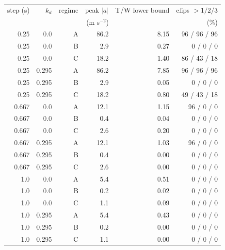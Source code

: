 \footnotesize
\begin{tabular}{rrrrrr}
\toprule
step (s) & $k_d$ & regime & peak $|a|$ & T/W lower bound & clips $>1/2/3$ \\
 & & & (m s$^{-2}$) & & (\%) \\
\midrule
0.25 & 0.0 & A & 86.2 & 8.15 & 96 / 96 / 96 \\
0.25 & 0.0 & B & 2.9 & 0.27 & 0 / 0 / 0 \\
0.25 & 0.0 & C & 18.2 & 1.40 & 86 / 43 / 18 \\
0.25 & 0.295 & A & 86.2 & 7.85 & 96 / 96 / 96 \\
0.25 & 0.295 & B & 2.9 & 0.05 & 0 / 0 / 0 \\
0.25 & 0.295 & C & 18.2 & 0.80 & 49 / 43 / 18 \\
0.667 & 0.0 & A & 12.1 & 1.15 & 96 / 0 / 0 \\
0.667 & 0.0 & B & 0.4 & 0.04 & 0 / 0 / 0 \\
0.667 & 0.0 & C & 2.6 & 0.20 & 0 / 0 / 0 \\
0.667 & 0.295 & A & 12.1 & 1.03 & 96 / 0 / 0 \\
0.667 & 0.295 & B & 0.4 & 0.00 & 0 / 0 / 0 \\
0.667 & 0.295 & C & 2.6 & 0.00 & 0 / 0 / 0 \\
1.0 & 0.0 & A & 5.4 & 0.51 & 0 / 0 / 0 \\
1.0 & 0.0 & B & 0.2 & 0.02 & 0 / 0 / 0 \\
1.0 & 0.0 & C & 1.1 & 0.09 & 0 / 0 / 0 \\
1.0 & 0.295 & A & 5.4 & 0.43 & 0 / 0 / 0 \\
1.0 & 0.295 & B & 0.2 & 0.00 & 0 / 0 / 0 \\
1.0 & 0.295 & C & 1.1 & 0.00 & 0 / 0 / 0 \\
\bottomrule
\end{tabular}
